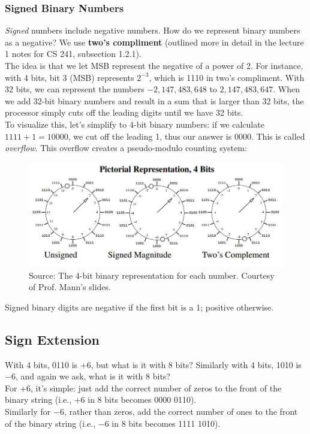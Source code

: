 \documentclass{report}
\begin{document}
\subsubsection{Signed Binary Numbers}
\textit{Signed} numbers include negative numbers. How do we represent binary numbers as a negative? We use \textbf{two's compliment} (outlined more in detail in the lecture 1 notes for CS 241, subsection 1.2.1).\\
The idea is that we let MSB represent the negative of a power of 2. For instance, with 4 bits, bit 3 (MSB) represents $2^{-3}$, which is 1110 in two's compliment. With 32 bits, we can represent the numbers $-2,147,483,648$ to $2,147,483,647$. When we add 32-bit binary numbers and result in a sum that is larger than 32 bits, the processor simply cuts off the leading digits until we have 32 bits.\\
To visualize this, let's simplify to 4-bit binary numbers: if we calculate $1111 + 1 = 10000$, we cut off the leading 1, thus our answer is $0000$. This is called \textit{overflow}. This overflow creates a pseudo-modulo counting system:
\begin{figure}[ht]
\begin{center}
\includegraphics[scale=0.5]{4-bit-representation.jpg}
\end{center}
\caption{Source: The 4-bit binary representation for each number. Courtesy of Prof. Mann's slides.}
\end{figure}
Signed binary digits are negative if the first bit is a 1; positive otherwise.
\subsection{Sign Extension}
With 4 bits, 0110 is $+6$, but what is it with 8 bits? Similarly with 4 bits, 1010 is $-6$, and again we ask, what is it with 8 bits? \\
For $+6$, it's simple: just add the correct number of zeros to the front of the binary string (i.e., $+6$ in 8 bits becomes 0000 0110).\\
Similarly for $-6$, rather than zeros, add the correct number of ones to the front of the binary string (i.e., $-6$ in 8 bits becomes 1111 1010).
\end{document}
